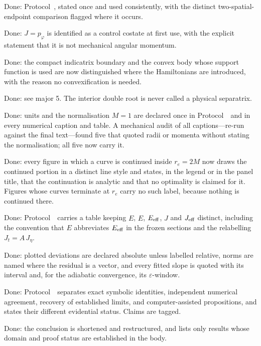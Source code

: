 \documentclass[11pt]{article}
\begin{document}
\begin{description}[leftmargin=2.6em,style=nextline,itemsep=1pt]
\item[M1] Done: Protocol~\msProtEndpoint, stated once and used consistently, with the
distinct two-spatial-endpoint comparison flagged where it occurs.
\item[M2] Done: $J=p_\varphi$ is identified as a control costate at first use,
with the explicit statement that it is not mechanical angular momentum.
\item[M3] Done: the compact indicatrix boundary and the convex body whose support
function is used are now distinguished where the Hamiltonians are introduced,
with the reason no convexification is needed.
\item[M4] Done: see major 5. The interior double root is never called a physical
separatrix.
\item[M5] Done: units and the normalisation $M=1$ are declared once in
Protocol~\msProtNames\ and in every numerical caption and table. A mechanical audit of
all captions---re-run against the final text---found five that quoted radii or
momenta without stating the normalisation; all five now carry it.
\item[M6] Done: every figure in which a curve is continued inside $r_e=2M$ now draws
the continued portion in a distinct line style and states, in the legend or in the
panel title, that the continuation is analytic and that no optimality is claimed for
it. Figures whose curves terminate at $r_e$ carry no such label, because nothing is
continued there.
\item[M7] Done: Protocol~\msProtNames\ carries a table keeping $E$, $\hat E$, $E_{\rm eff}$,
$J$ and $J_{\rm eff}$ distinct, including the convention that $E$ abbreviates
$E_{\rm eff}$ in the frozen sections and the relabelling $J_t=A\,J_\eta$.
\item[M8] Done: plotted deviations are declared absolute unless labelled
relative, norms are named where the residual is a vector, and every fitted slope
is quoted with its interval and, for the adiabatic convergence, its
$\varepsilon$-window.
\item[M9] Done: Protocol~\msProtEvidence\ separates exact symbolic identities, independent
numerical agreement, recovery of established limits, and computer-assisted
propositions, and states their different evidential status. Claims are tagged.
\item[M10] Done: the conclusion is shortened and restructured, and lists only
results whose domain and proof status are established in the body.
\end{description}
\end{document}
